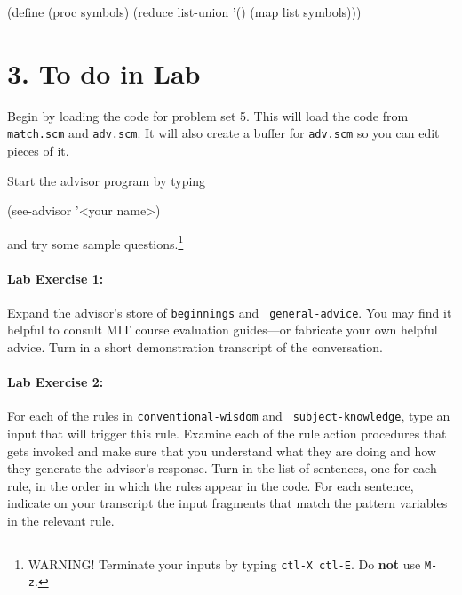 \beginlisp
(define (proc symbols)
  (reduce list-union
          '()
          (map list symbols)))
\endlisp

\section{3. To do in Lab}

Begin by loading the code for problem set 5.  This will load the code
from {\tt match.scm} and {\tt adv.scm}.  It will also create a buffer
for {\tt adv.scm} so you can edit pieces of it.

Start the advisor program by typing

\beginlisp
(see-advisor '<your name>)
\endlisp

\noindent and try some sample questions.\footnote{WARNING!  Terminate
your inputs by typing {\tt ctl-X ctl-E}.  Do {\bf not} use {\tt M-z}.}


\paragraph{Lab Exercise 1:} 
Expand the advisor's store of {\tt beginnings} and {\tt
general-advice}.  You may find it helpful to consult MIT course
evaluation guides---or fabricate your own helpful advice.  Turn in a
short demonstration transcript of the conversation.

\paragraph{Lab Exercise 2:}
For each of the rules in {\tt conventional-wisdom} and {\tt
subject-knowledge}, type an input that will trigger this rule.
Examine each of the rule action procedures that gets invoked and make
sure that you understand what they are doing and how they generate the
advisor's response.  Turn in the list of sentences, one for each rule,
in the order in which the rules appear in the code.  For each sentence,
indicate on your transcript the input fragments that match the pattern
variables in the relevant rule.

